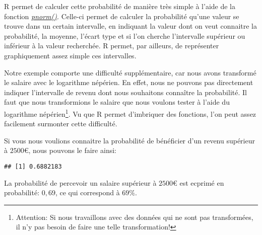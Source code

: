 \documentclass[
]{book}
\newenvironment{Shaded}{\begin{snugshade}}{\end{snugshade}}
\newcommand{\AttributeTok}[1]{\textcolor[rgb]{0.77,0.63,0.00}{#1}}
\newcommand{\CommentTok}[1]{\textcolor[rgb]{0.56,0.35,0.01}{\textit{#1}}}
\newcommand{\DecValTok}[1]{\textcolor[rgb]{0.00,0.00,0.81}{#1}}
\newcommand{\FunctionTok}[1]{\textcolor[rgb]{0.00,0.00,0.00}{#1}}
\newcommand{\NormalTok}[1]{#1}
\newcommand{\SpecialCharTok}[1]{\textcolor[rgb]{0.00,0.00,0.00}{#1}}
\begin{document}
R permet de calculer cette probabilité de manière très simple à l'aide de la fonction \href{https://www.rdocumentation.org/packages/stats/versions/3.6.2/topics/Normal}{\emph{pnorm()}}. Celle-ci permet de calculer la probabilité qu'une valeur se trouve dans un certain intervalle, en indiquant la valeur dont on veut connaitre la probabilité, la moyenne, l'écart type et si l'on cherche l'intervalle supérieur ou inférieur à la valeur recherchée. R permet, par ailleurs, de représenter graphiquement assez simple ces intervalles.

Notre exemple comporte une difficulté supplémentaire, car nous avons transformé le salaire avec le logarithme népérien. En effet, nous ne pouvons pas directement indiquer l'intervalle de revenu dont nous souhaitons connaître la probabilité. Il faut que nous transformions le salaire que nous voulons tester à l'aide du logarithme népérien\footnote{Attention: Si nous travaillons avec des données qui ne sont pas transformées, il n'y pas besoin de faire une telle transformation!}. Vu que R permet d'imbriquer des fonctions, l'on peut assez facilement surmonter cette difficulté.

Si vous nous voulions connaitre la probabilité de bénéficier d'un revenu supérieur à \(2500€\), nous pouvons le faire ainsi:

\begin{Shaded}
\end{Shaded}

\begin{verbatim}
## [1] 0.6882183
\end{verbatim}

La probabilité de percevoir un salaire supérieur à \(2500€\) est ecprimé en probabilité: \(0,69\), ce qui correspond à \(69\%\).
\end{document}
